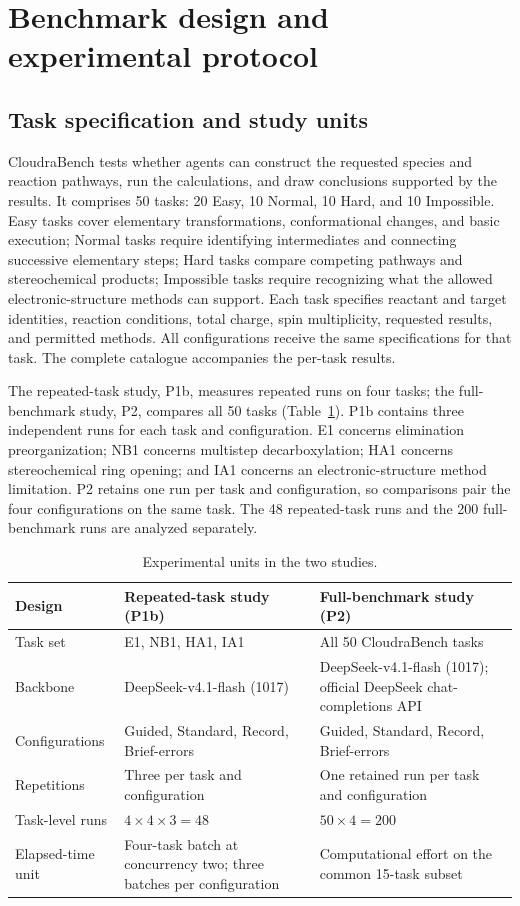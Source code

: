 \section{Benchmark design and experimental protocol}
\label{sec:si-protocol}

\subsection{Task specification and study units}
CloudraBench tests whether agents can construct the requested species and reaction pathways, run the calculations, and draw conclusions supported by the results. It comprises 50 tasks: 20 Easy, 10 Normal, 10 Hard, and 10 Impossible. Easy tasks cover elementary transformations, conformational changes, and basic execution; Normal tasks require identifying intermediates and connecting successive elementary steps; Hard tasks compare competing pathways and stereochemical products; Impossible tasks require recognizing what the allowed electronic-structure methods can support. Each task specifies reactant and target identities, reaction conditions, total charge, spin multiplicity, requested results, and permitted methods. All configurations receive the same specifications for that task. The complete catalogue accompanies the per-task results.

The repeated-task study, P1b, measures repeated runs on four tasks; the full-benchmark study, P2, compares all 50 tasks (Table~\ref{tab:si-study-design}). P1b contains three independent runs for each task and configuration. E1 concerns elimination preorganization; NB1 concerns multistep decarboxylation; HA1 concerns stereochemical ring opening; and IA1 concerns an electronic-structure method limitation. P2 retains one run per task and configuration, so comparisons pair the four configurations on the same task. The 48 repeated-task runs and the 200 full-benchmark runs are analyzed separately.

\begin{table}[htbp]
\centering
\caption{Experimental units in the two studies.}
\label{tab:si-study-design}
\small
\begin{tabular}{p{}p{}p{}}
\toprule
Design & Repeated-task study (P1b) & Full-benchmark study (P2) \\
\midrule
Task set & E1, NB1, HA1, IA1 & All 50 CloudraBench tasks \\
Backbone & DeepSeek-v4.1-flash (1017) & DeepSeek-v4.1-flash (1017); official DeepSeek chat-completions API \\
Configurations & Guided, Standard, Record, Brief-errors & Guided, Standard, Record, Brief-errors \\
Repetitions & Three per task and configuration & One retained run per task and configuration \\
Task-level runs & $4\times4\times3=48$ & $50\times4=200$ \\
Elapsed-time unit & Four-task batch at concurrency two; three batches per configuration & Computational effort on the common 15-task subset \\
\bottomrule
\end{tabular}
\end{table}

